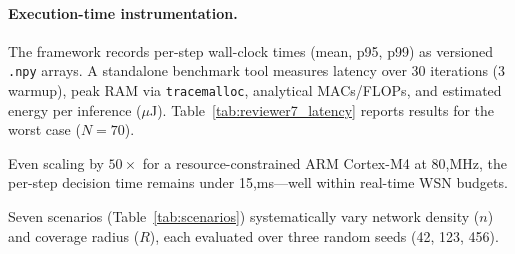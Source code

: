 \paragraph{Execution-time instrumentation.}
The framework records per-step wall-clock times (mean, p95, p99) as versioned \texttt{.npy} arrays. A standalone benchmark tool measures latency over 30 iterations (3 warmup), peak RAM via \texttt{tracemalloc}, analytical MACs/FLOPs, and estimated energy per inference ($\mu$J). Table~\ref{tab:reviewer7_latency} reports results for the worst case ($N{=}70$).

\begin{table}[!ht]
\caption{Inference metrics (Apple M-series CPU, 0.1\,W reference). All algorithms achieve sub-millisecond latency.}
\label{tab:reviewer7_latency}
\renewcommand{\arraystretch}{1.0}
\end{table}

Even scaling by $50\times$ for a resource-constrained ARM Cortex-M4 at 80,MHz, the per-step decision time remains under 15,ms---well within real-time WSN budgets.

Seven scenarios (Table~\ref{tab:scenarios}) systematically vary network density ($n$) and coverage radius ($R$), each evaluated over three random seeds (42, 123, 456).

\begin{table}[!ht]
\caption{Overview of the seven evaluation scenarios.}
\label{tab:scenarios}
\renewcommand{\arraystretch}{1.0}
\end{table}

